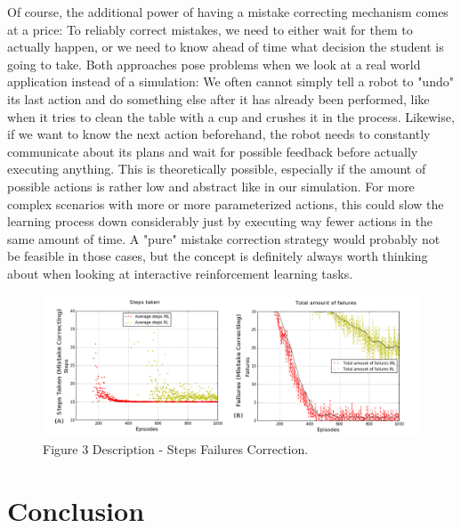 \documentclass[12pt,twoside]{article}
\theoremstyle{plain}
\theoremstyle{definition}
\theoremstyle{remark}
\begin{document}
Of course, the additional power of having a mistake correcting mechanism comes at a price: To reliably correct mistakes, we need to either wait for them to actually happen, or we need to know ahead of time what decision the student is going to take. Both approaches pose problems when we look at a real world application instead of a simulation: We often cannot simply tell a robot to "undo" its last action and do something else after it has already been performed, like when it tries to clean the table with a cup and crushes it in the process. Likewise, if we want to know the next action beforehand, the robot needs to constantly communicate about its plans and wait for possible feedback before actually executing anything. This is theoretically possible, especially if the amount of possible actions is rather low and abstract like in our simulation. For more complex scenarios with more or more parameterized actions, this could slow the learning process down considerably just by executing way fewer actions in the same amount of time. A "pure" mistake correction strategy would probably not be feasible in those cases, but the concept is definitely always worth thinking about when looking at interactive reinforcement learning tasks.

\begin{figure}[H]
      \centering
      \includegraphics[scale=0.5]{steps_failures_correction.png}     
      \caption{\scriptsize Figure 3 Description - Steps Failures Correction.}
      \label{stepsfailurescorrection}
\end{figure}

\section{Conclusion}
\end{document}
